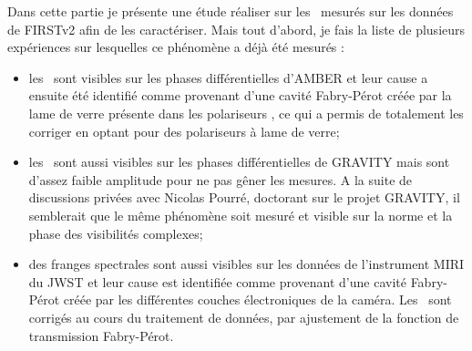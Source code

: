 



Dans cette partie je présente une étude réaliser sur les \wiggles~mesurés sur les données de \ac{FIRSTv2} afin de les caractériser. Mais tout d'abord, je fais la liste de plusieurs expériences sur lesquelles ce phénomène a déjà été mesurés :

\begin{itemize}
    \item les \wiggles~sont visibles sur les phases différentielles d'\ac{AMBER} \citep{millour2008} et leur cause a ensuite été identifié comme provenant d'une cavité Fabry-Pérot créée par la lame de verre présente dans les polariseurs \citep{malbet2008}, ce qui a permis de totalement les corriger en optant pour des polariseurs à lame de verre;
    \item les \wiggles~sont aussi visibles sur les phases différentielles de \ac{GRAVITY} \citep{amorim2020} mais sont d'assez faible amplitude pour ne pas gêner les mesures. A la suite de discussions privées avec Nicolas Pourré, doctorant sur le projet \ac{GRAVITY}, il semblerait que le même phénomène soit mesuré et visible sur la norme et la phase des visibilités complexes;
    \item des franges spectrales sont aussi visibles sur les données de l'instrument \ac{MIRI} du \ac{JWST} \citep{argyriou2020} et leur cause est identifiée comme provenant d'une cavité Fabry-Pérot créée par les différentes couches électroniques de la caméra. Les \wiggles~sont corrigés au cours du traitement de données, par ajustement de la fonction de transmission Fabry-Pérot.
\end{itemize}


